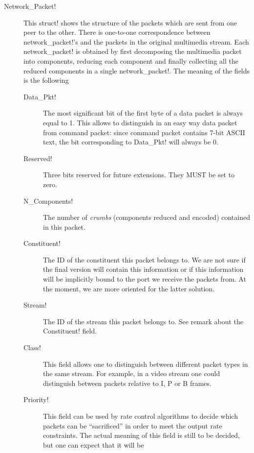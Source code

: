 \documentclass{medusabook}
\begin{document}
\begin{description}
  \item[\ttt Network\_Packet!]  This \ttt struct! shows the structure
  of the packets which are sent from one peer to the other.  There is
  one-to-one correspondence between  \ttt
  network\_packet!'s and the packets in the original multimedia
  stream.  Each \ttt network\_packet! is obtained by first decomposing
  the multimedia packet into components, reducing each component and
  finally collecting all the reduced components in a single \ttt
  network\_packet!.  The meaning of the fields is the following
  \begin{description}
    \item[\ttt Data\_Pkt!] The most significant bit of the first byte
    of a data packet is always equal to 1.  This allows to
    distinguish in an easy way data packet from command packet: since
    command packet contains 7-bit ASCII text, the bit corresponding to
    \ttt Data\_Pkt! will always be 0.
    \item[\ttt Reserved!] Three bits reserved for future extensions.
    They MUST be set to zero.
    \item[{\ttt N_Components!}] The number of \emph{crumbs}
    (components reduced and encoded) contained in this packet.
    \item[\ttt Constituent!] The ID of the constituent this packet
    belongs to.  We are not sure if the final version will contain
    this information or if this information will be implicitly bound
    to the port we receive the packets from.  At the moment, we are
    more oriented for the latter solution.
    \item[\ttt Stream!] The ID of the stream this packet
    belongs to.  See remark about the \ttt Constituent! field.
    \item[\ttt Class!] This field allows one to distinguish
    between different packet types in the same stream.  For example,
    in a video stream one could distinguish between packets relative
    to I, P or B frames.
    \item[\ttt Priority!]  This field can be used by rate control
    algorithms to decide which packets can be ``sacrificed'' in order
    to meet the output rate constraints.  The actual meaning of this
    field is still to be decided, but one can expect that it will be

\end{description}
\end{description}
\end{document}
